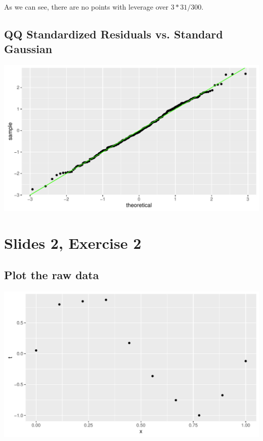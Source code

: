 \documentclass[a4paper,12pt]{article}\usepackage[]{graphicx}\usepackage[]{color}
\makeatletter
\def\maxwidth{ %
  \ifdim\Gin@nat@width>\linewidth
    \linewidth
  \else
    \Gin@nat@width
  \fi
}
\newenvironment{knitrout}{}{} %
\makeatother
\begin{document}
As we can see, there are no points with leverage over $3 * 31/300$.

\subsection{ QQ Standardized Residuals vs. Standard Gaussian }

\begin{knitrout}
\color{fgcolor}
\includegraphics[width=\maxwidth]{figure/QQ_plot-1} 

\end{knitrout}

\section{Slides 2, Exercise 2}

\subsection{ Plot the raw data }

\begin{knitrout}
\color{fgcolor}
\includegraphics[width=\maxwidth]{figure/plot_raw-1} 

\end{knitrout}
\end{document}
